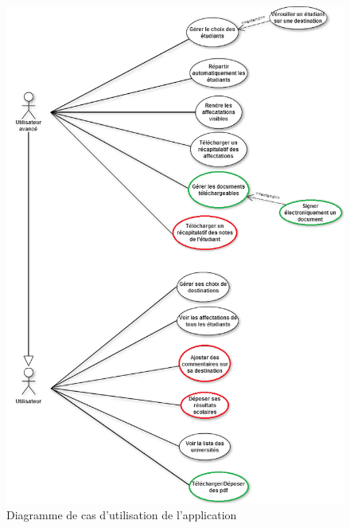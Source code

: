 \begin{figure}
	\centering
	\includegraphics[scale=0.7]{images/useCaseDiagram.png}
	\caption{Diagramme de cas d'utilisation de l'application}
	\label{useCase}
\end{figure}